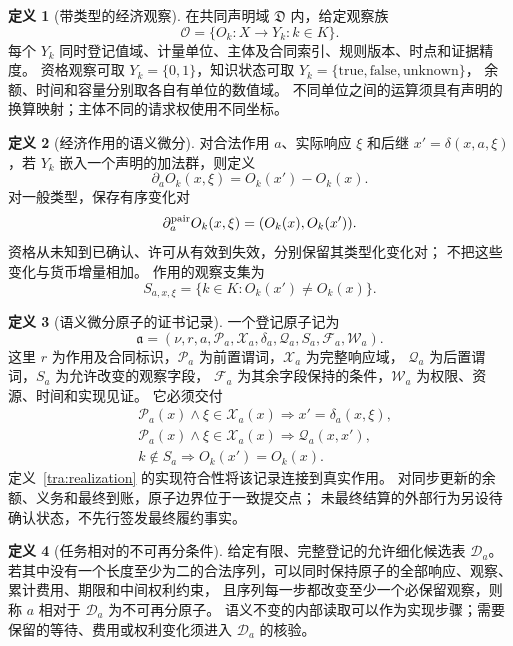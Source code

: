 \documentclass[UTF8,12pt,a4paper,openany,fontset=none,zihao=false]{ctexrep}
\theoremstyle{definition}
\newtheorem{definition}{定义}[chapter]
\newcommand{\1}{\mathbf 1}
\begin{document}
\begin{definition}[带类型的经济观察]
\label{atom:typed}
在共同声明域 \(\mathfrak D\) 内，给定观察族
\[
\mathcal O=\{O_k:X\to Y_k:k\in K\}.
\]
每个 \(Y_k\) 同时登记值域、计量单位、主体及合同索引、规则版本、时点和证据精度。
资格观察可取 \(Y_k=\{0,1\}\)，知识状态可取
\(Y_k=\{\mathrm{true},\mathrm{false},\mathrm{unknown}\}\)，
余额、时间和容量分别取各自有单位的数值域。
不同单位之间的运算须具有声明的换算映射；主体不同的请求权使用不同坐标。
\end{definition}

\begin{definition}[经济作用的语义微分]
\label{atom:differential}
对合法作用 \(a\)、实际响应 \(\xi\) 和后继
\(x'=\delta(x,a,\xi)\)，若 \(Y_k\) 嵌入一个声明的加法群，则定义
\[
\partial_a O_k(x,\xi)=O_k(x')-O_k(x).
\]
对一般类型，保存有序变化对
\[
\partial_a^{\rm pair}O_k(x,\xi)=(O_k(x),O_k(x')).
\]
资格从未知到已确认、许可从有效到失效，分别保留其类型化变化对；
不把这些变化与货币增量相加。
作用的观察支集为
\[
S_{a,x,\xi}=\{k\in K:O_k(x')\ne O_k(x)\}.
\]
\end{definition}

\begin{definition}[语义微分原子的证书记录]
\label{atom:record}
一个登记原子记为
\[
\mathfrak a=(\nu,r,a,\mathcal P_a,\mathcal X_a,
\delta_a,\mathcal Q_a,S_a,\mathcal F_a,\mathcal W_a).
\]
这里 \(r\) 为作用及合同标识，\(\mathcal P_a\) 为前置谓词，\(\mathcal X_a\) 为完整响应域，
\(\mathcal Q_a\) 为后置谓词，\(S_a\) 为允许改变的观察字段，
\(\mathcal F_a\) 为其余字段保持的条件，\(\mathcal W_a\) 为权限、资源、时间和实现见证。
它必须交付
\[
\begin{aligned}
&\mathcal P_a(x)\land\xi\in\mathcal X_a(x)
  \Longrightarrow x'=\delta_a(x,\xi),\\
&\mathcal P_a(x)\land\xi\in\mathcal X_a(x)
  \Longrightarrow\mathcal Q_a(x,x'),\\
&k\notin S_a
  \Longrightarrow O_k(x')=O_k(x).
\end{aligned}
\]
定义~\ref{tra:realization} 的实现符合性将该记录连接到真实作用。
对同步更新的余额、义务和最终到账，原子边界位于一致提交点；
未最终结算的外部行为另设待确认状态，不先行签发最终履约事实。
\end{definition}

\begin{definition}[任务相对的不可再分条件]
\label{atom:minimal}
给定有限、完整登记的允许细化候选表 \(\mathcal D_a\)。
若其中没有一个长度至少为二的合法序列，可以同时保持原子的全部响应、观察、累计费用、期限和中间权利约束，
且序列每一步都改变至少一个必保留观察，则称 \(a\) 相对于 \(\mathcal D_a\) 为不可再分原子。
语义不变的内部读取可以作为实现步骤；需要保留的等待、费用或权利变化须进入 \(\mathcal D_a\) 的核验。
\end{definition}
\end{document}
